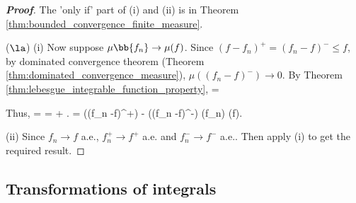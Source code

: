 \begin{proof}[\bf Proof]
The 'only if' part of (i) and (ii) is in Theorem \ref{thm:bounded_convergence_finite_measure}.

($\la$) (i) Now suppose $\mu\bb{f_n}\to \mu(f)$. Since $(f-f_n)^+ = (f_n -f)^- \leq f$, by dominated convergence theorem (Theorem \ref{thm:dominated_convergence_measure}), $\mu((f_n - f)^-) \to 0$. By Theorem \ref{thm:lebesgue_integrable_function_property},
\be
{} =  \leq \mu{} 
\ee

Thus,
\be
{} =  = \leq {} + .
\ee
\be
\ra\quad\quad \mu{} = \mu((f_n -f)^+) - \mu((f_n -f)^-)  \quad \ra\quad \mu(f_n) \to \mu(f).
\ee

(ii) Since $f_n \to f$ a.e., $f_n^+ \to f^+$ a.e. and $f_n^- \to f^-$ a.e.. Then apply (i) to get the required result.
\end{proof}


\subsection{Transformations of integrals}

